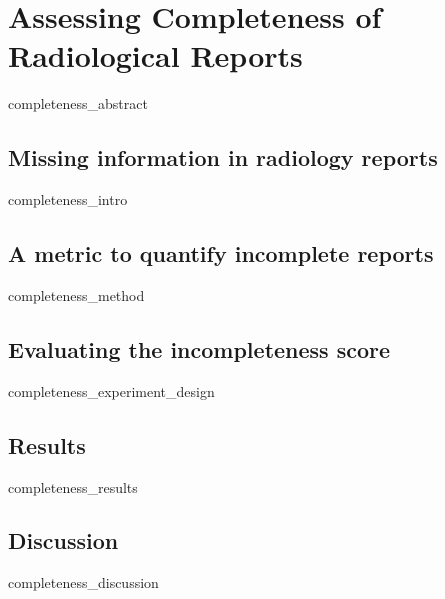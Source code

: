 \chapter{Assessing Completeness of Radiological Reports}
{completeness_abstract}

\section{Missing information in radiology reports}
{completeness_intro}
\clearpage

\section{A metric to quantify incomplete reports}
{completeness_method}
\clearpage

\section{Evaluating the incompleteness score}
{completeness_experiment_design}
\clearpage

\section{Results}
{completeness_results}
\clearpage

\section{Discussion}
{completeness_discussion}